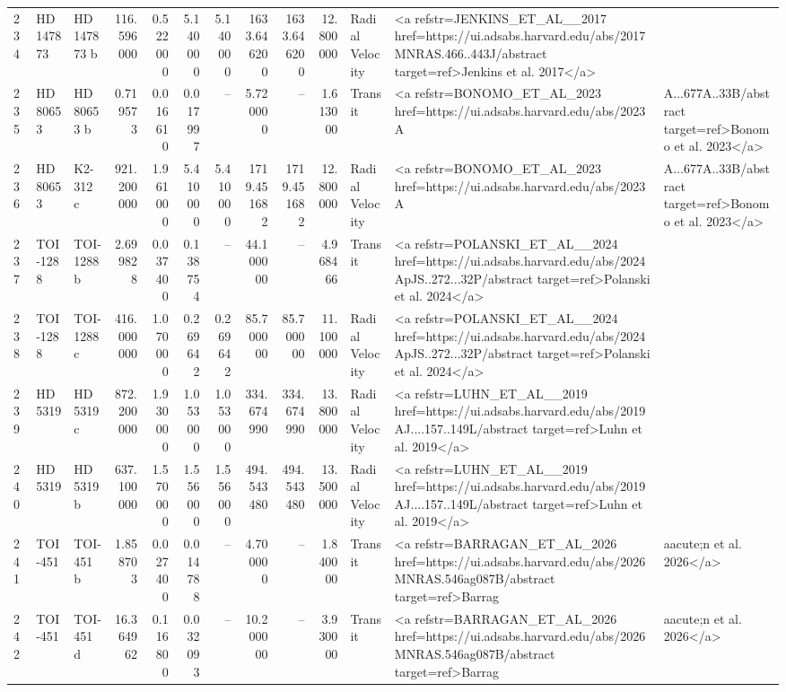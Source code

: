 \begin{tabular}{lllrrrrrrrll}
234 & HD 147873 & HD 147873 b & 116.596000 & 0.522000 & 5.140000 & 5.140000 & 1633.646200 & 1633.646200 & 12.800000 & Radial Velocity & <a refstr=JENKINS_ET_AL__2017 href=https://ui.adsabs.harvard.edu/abs/2017MNRAS.466..443J/abstract target=ref>Jenkins et al. 2017</a> \\
235 & HD 80653 & HD 80653 b & 0.719573 & 0.016610 & 0.017997 & -- & 5.720000 & -- & 1.613000 & Transit & <a refstr=BONOMO_ET_AL_2023 href=https://ui.adsabs.harvard.edu/abs/2023A&A...677A..33B/abstract target=ref>Bonomo et al. 2023</a> \\
236 & HD 80653 & K2-312 c & 921.200000 & 1.961000 & 5.410000 & 5.410000 & 1719.451682 & 1719.451682 & 12.800000 & Radial Velocity & <a refstr=BONOMO_ET_AL_2023 href=https://ui.adsabs.harvard.edu/abs/2023A&A...677A..33B/abstract target=ref>Bonomo et al. 2023</a> \\
237 & TOI-1288 & TOI-1288 b & 2.699828 & 0.037400 & 0.138754 & -- & 44.100000 & -- & 4.968466 & Transit & <a refstr=POLANSKI_ET_AL__2024 href=https://ui.adsabs.harvard.edu/abs/2024ApJS..272...32P/abstract target=ref>Polanski et al. 2024</a> \\
238 & TOI-1288 & TOI-1288 c & 416.000000 & 1.070000 & 0.269642 & 0.269642 & 85.700000 & 85.700000 & 11.100000 & Radial Velocity & <a refstr=POLANSKI_ET_AL__2024 href=https://ui.adsabs.harvard.edu/abs/2024ApJS..272...32P/abstract target=ref>Polanski et al. 2024</a> \\
239 & HD 5319 & HD 5319 c & 872.200000 & 1.930000 & 1.053000 & 1.053000 & 334.674990 & 334.674990 & 13.800000 & Radial Velocity & <a refstr=LUHN_ET_AL__2019 href=https://ui.adsabs.harvard.edu/abs/2019AJ....157..149L/abstract target=ref>Luhn et al. 2019</a> \\
240 & HD 5319 & HD 5319 b & 637.100000 & 1.570000 & 1.556000 & 1.556000 & 494.543480 & 494.543480 & 13.500000 & Radial Velocity & <a refstr=LUHN_ET_AL__2019 href=https://ui.adsabs.harvard.edu/abs/2019AJ....157..149L/abstract target=ref>Luhn et al. 2019</a> \\
241 & TOI-451 & TOI-451 b & 1.858703 & 0.027400 & 0.014788 & -- & 4.700000 & -- & 1.840000 & Transit & <a refstr=BARRAGAN_ET_AL_2026 href=https://ui.adsabs.harvard.edu/abs/2026MNRAS.546ag087B/abstract target=ref>Barrag&aacute;n et al. 2026</a> \\
242 & TOI-451 & TOI-451 d & 16.364962 & 0.116800 & 0.032093 & -- & 10.200000 & -- & 3.930000 & Transit & <a refstr=BARRAGAN_ET_AL_2026 href=https://ui.adsabs.harvard.edu/abs/2026MNRAS.546ag087B/abstract target=ref>Barrag&aacute;n et al. 2026</a> \\

\end{tabular}
